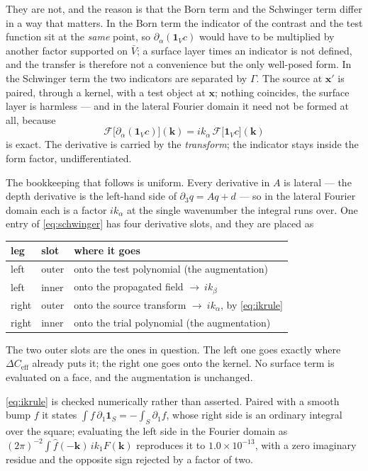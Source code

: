 \documentclass[11pt,a4paper]{article}
\begin{document}
They are not, and the reason is that the Born term and the Schwinger term differ
in a way that matters.  In the Born term the indicator of the contrast and the
test function sit at the \emph{same} point, so $\partial_\alpha(\mathbf{1}_V c)$
would have to be multiplied by another factor supported on $\bar{V}$; a surface
layer times an indicator is not defined, and the transfer is therefore not a
convenience but the only well-posed form.  In the Schwinger term the two
indicators are separated by $\Gamma$.  The source at $\mathbf{x}'$ is paired,
through a kernel, with a test object at $\mathbf{x}$; nothing coincides, the
surface layer is harmless --- and in the lateral Fourier domain it need not be
formed at all, because
\begin{equation}\label{eq:ikrule}
  \mathcal{F}\bigl[\partial_\alpha(\mathbf{1}_V c)\bigr](\mathbf{k})
  = i k_\alpha\, \mathcal{F}\bigl[\mathbf{1}_V c\bigr](\mathbf{k})
\end{equation}
is exact.  The derivative is carried by the \emph{transform}; the indicator
stays inside the form factor, undifferentiated.

The bookkeeping that follows is uniform.  Every derivative in $A$ is lateral ---
the depth derivative is the left-hand side of $\partial_3 q = Aq+d$ --- so in the
lateral Fourier domain each is a factor $ik_\alpha$ at the single wavenumber the
integral runs over.  One entry of \eqref{eq:schwinger} has four derivative slots,
and they are placed as
\begin{center}
\begin{tabular}{lll}
\toprule
leg & slot & where it goes\\
\midrule
left  & outer & onto the test polynomial \quad(the augmentation)\\
left  & inner & onto the propagated field \quad$\to\ ik_\beta$\\
right & outer & onto the source transform \quad$\to\ ik_\alpha$, by \eqref{eq:ikrule}\\
right & inner & onto the trial polynomial \quad(the augmentation)\\
\bottomrule
\end{tabular}
\end{center}
The two outer slots are the ones in question.  The left one goes exactly where
$\Delta C_{\text{eff}}$ already puts it; the right one goes onto the kernel.  No
surface term is evaluated on a face, and the augmentation is unchanged.

\eqref{eq:ikrule} is checked numerically rather than asserted.  Paired with a
smooth bump $f$ it states
$\int f\,\partial_1\mathbf{1}_S = -\int_S \partial_1 f$, whose right side is an
ordinary integral over the square; evaluating the left side in the Fourier
domain as $(2\pi)^{-2}\!\int \hat{f}(-\mathbf{k})\,ik_1 F(\mathbf{k})$ reproduces
it to $1.0\times10^{-13}$, with a zero imaginary residue and the opposite sign
rejected by a factor of two.
\end{document}
